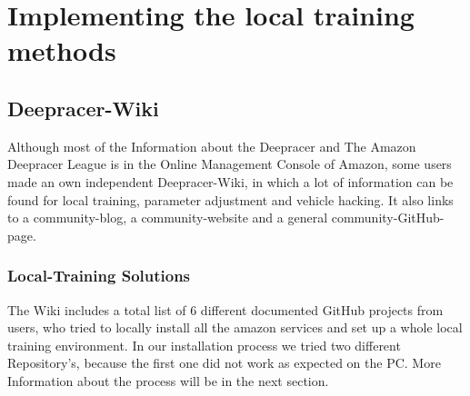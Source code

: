 \section{Implementing the local training methods}

\subsection{Deepracer-Wiki}
Although most of the Information about the Deepracer and The Amazon Deepracer League is in the Online Management Console of Amazon, some users made an own independent Deepracer-Wiki, in which a lot of information can be found for local training, parameter adjustment and vehicle hacking. It also links to a community-blog, a community-website and a general community-GitHub-page. 

\subsubsection{Local-Training Solutions}
The Wiki includes a total list of 6 different documented GitHub projects from users, who tried to locally install all the amazon services and set up a whole local training environment. In our installation process we tried two different Repository's, because the first one did not work as expected on the PC. More Information about the process will be in the next section.

